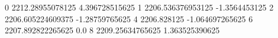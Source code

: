 0 2212.28955078125 4.396728515625
1 2206.536376953125 -1.3564453125
2 2206.605224609375 -1.28759765625
4 2206.828125 -1.064697265625
6 2207.892822265625 0.0
8 2209.25634765625 1.363525390625
